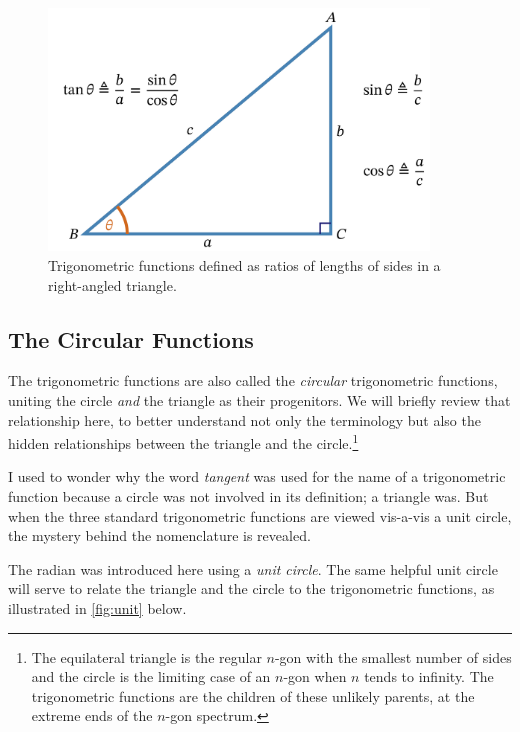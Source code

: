 \documentclass[
  a4paper,
]{article}
\begin{document}
\begin{figure}
\hypertarget{fig:trig}{%
\centering
\includegraphics[width=0.9\textwidth,height=\textheight]{images/trig.png}
\caption{Trigonometric functions defined as ratios of lengths of sides
in a right-angled triangle.}\label{fig:trig}
}
\end{figure}

\hypertarget{the-circular-functions}{%
\subsection{The Circular Functions}\label{the-circular-functions}}

The trigonometric functions are also called the \emph{circular}
trigonometric functions, uniting the circle \emph{and} the triangle as
their progenitors. We will briefly review that relationship here, to
better understand not only the terminology but also the hidden
relationships between the triangle and the circle.\footnote{The
  equilateral triangle is the regular \(n\)-gon with the smallest number
  of sides and the circle is the limiting case of an \(n\)-gon when
  \(n\) tends to infinity. The trigonometric functions are the children
  of these unlikely parents, at the extreme ends of the \(n\)-gon
  spectrum.}

I used to wonder why the word \emph{tangent} was used for the name of a
trigonometric function because a circle was not involved in its
definition; a triangle was. But when the three standard trigonometric
functions are viewed vis-a-vis a unit circle, the mystery behind the
nomenclature is revealed.

The radian was introduced here using a \emph{unit circle}. The same
helpful unit circle will serve to relate the triangle and the circle to
the trigonometric functions, as illustrated in \cref{fig:unit} below.
\end{document}
